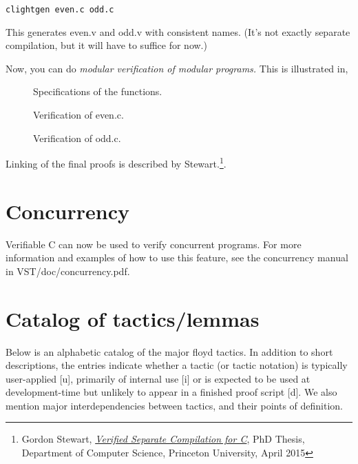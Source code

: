 \documentclass[12pt,fleqn,openany,oneside,showtrims]{memoir}
\begin{document}
\noindent\texttt{clightgen even.c odd.c}

This generates even.v and odd.v with consistent names.  (It's not
exactly separate compilation, but it will have to suffice for now.)

Now, you can do \emph{modular verification of modular programs.}  This is
illustrated in,

\begin{description}
\item[]  Specifications of the functions.
\item[] Verification of even.c.
\item[] Verification of odd.c.
\end{description}
Linking of the final proofs is described by Stewart.\footnote{Gordon Stewart,
  \emph{\href{http://www.cs.princeton.edu/research/techreps/TR-980-15}{Verified Separate Compilation for C}}, PhD Thesis, Department of Computer Science, Princeton University, April 2015}.

\chapter{Concurrency}
\label{refcard:concurrency}
Verifiable C can now be used to verify concurrent programs. For more information and examples of how to use this feature, see the concurrency manual in VST/doc/concurrency.pdf.

\chapter{Catalog of tactics/lemmas}
Below is an alphabetic catalog of the major floyd tactics. In addition
to short descriptions, the entries indicate whether a tactic (or
tactic notation) is typically user-applied [u], primarily of
internal use [i] or is expected to be used at development-time
but unlikely to appear in a finished proof script [d]. We also
mention major interdependencies between tactics, and their points of
definition.
\end{document}
